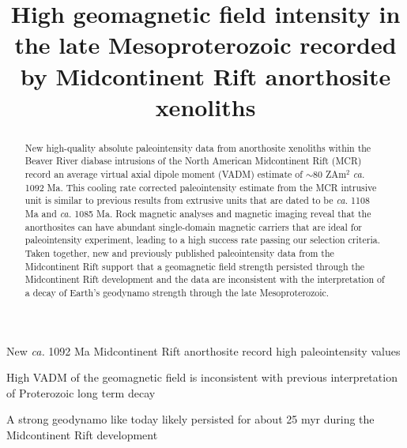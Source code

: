 \documentclass[draft]{agujournal2019}
\begin{document}
\title{High geomagnetic field intensity in the late Mesoproterozoic recorded by Midcontinent Rift anorthosite xenoliths}





\begin{keypoints}
\item New \textit{ca.} 1092 Ma Midcontinent Rift anorthosite record high paleointensity values
\item High VADM of the geomagnetic field is inconsistent with previous interpretation of Proterozoic long term decay
\item A strong geodynamo like today likely persisted for about 25 myr during the Midcontinent Rift development
\end{keypoints}





\begin{abstract}
New high-quality absolute paleointensity data from anorthosite xenoliths within the Beaver River diabase intrusions of the North American Midcontinent Rift (MCR) record an average virtual axial dipole moment (VADM) estimate of $\sim$80 ZAm$^2$ \textit{ca.} 1092 Ma. This cooling rate corrected paleointensity estimate from the MCR intrusive unit is similar to previous results from extrusive units that are dated to be \textit{ca.} 1108 Ma and \textit{ca.} 1085 Ma. Rock magnetic analyses and magnetic imaging reveal that the anorthosites can have abundant single-domain magnetic carriers that are ideal for paleointensity experiment, leading to a high success rate passing our selection criteria. Taken together, new and previously published paleointensity data from the Midcontinent Rift support that a geomagnetic field strength persisted through the Midcontinent Rift development and the data are inconsistent with the interpretation of a decay of Earth's geodynamo strength through the late Mesoproterozoic. 


\end{abstract}
\end{document}
